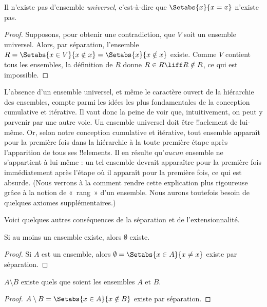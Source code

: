 \documentclass[../../../include/open-logic-section]{subfiles}
\begin{document}
\begin{thm}
Il n'existe pas d'ensemble \emph{universel}, c'est-à-dire que
$\Setabs{x}{x = x}$ n'existe pas.
\end{thm}

\begin{proof}
Supposons, pour obtenir une contradiction, que $V$ soit un ensemble
universel. Alors, par séparation, l'ensemble
$R = \Setabs{x \in V}{x \notin x} = \Setabs{x}{x \notin x}$ existe.
Comme $V$ contient tous les ensembles, la définition de $R$ donne
$R \in R \liff R \notin R$, ce qui est impossible.
\end{proof}

L'absence d'un ensemble universel, et même le caractère ouvert de la
hiérarchie des ensembles, compte parmi les idées les plus fondamentales
de la conception cumulative et itérative. Il vaut donc la peine de
voir que, intuitivement, on peut y parvenir par une autre voie. Un
ensemble universel doit être !!a{element} de lui-même. Or, selon
notre conception cumulative et itérative, tout ensemble apparaît pour
la première fois dans la hiérarchie à la toute première étape après
l'apparition de tous ses !!{element}s. Il en
résulte qu'\emph{aucun} ensemble ne s'appartient à lui-même : un tel
ensemble devrait apparaître pour la première fois immédiatement après
l'étape où il apparaît pour la première fois, ce qui est absurde.
(Nous verrons à la  comment
rendre cette explication plus rigoureuse grâce à la notion de
«~rang~» d'un ensemble. Nous aurons toutefois besoin de quelques
axiomes supplémentaires.)

Voici quelques autres conséquences de la séparation et de
l'extensionnalité.

\begin{prop}
Si au moins un ensemble existe, alors $\emptyset$ existe.
\end{prop}

\begin{proof}
Si $A$ est un ensemble, alors
$\emptyset = \Setabs{x \in A}{x \neq x}$ existe par séparation.
\end{proof}

\begin{prop}
$A \setminus B$ existe quels que soient les ensembles $A$ et $B$.
\end{prop}

\begin{proof}
$A \setminus B = \Setabs{x \in A}{x \notin B}$ existe par séparation.
\end{proof}
\end{document}
